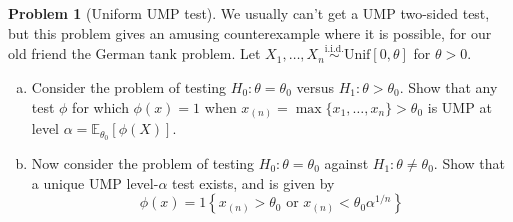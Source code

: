 \documentclass{article}
\newcommand{\EE}{\mathbb{E}}
\newcommand{\simiid}{\overset{\text{i.i.d.}}{\sim}}
\theoremstyle{definition}
\newtheorem{problem}{Problem}
\begin{document}
\begin{problem}[Uniform UMP test]
We usually can't get a UMP two-sided test, but this problem gives an amusing counterexample where it is possible, for our old friend the German tank problem. Let $X_1, \ldots, X_n \simiid \text{Unif}[0,\theta]$ for $\theta > 0$.
\begin{enumerate}[(a)]
\item Consider the problem of testing $H_0: \theta = \theta_0$
  versus $H_1: \theta > \theta_0$.  Show that any test $\phi$ for which $\phi(x) = 1$ when $x_{(n)} = \max\{x_1, \ldots, x_n\} > \theta_0$ is UMP at level $\alpha = \EE_{\theta_0}[\phi(X)]$.

  


\item  Now consider the problem of testing $H_0: \theta = \theta_0$
against $H_1: \theta \neq \theta_0$.  Show that a unique UMP level-$\alpha$ test exists,
and is given by
\[
\phi(x) = 1\left\{x_{(n)} > \theta_0 \text{ or } x_{(n)} < \theta_0 \alpha^{1/n}\right\}
\]



\end{enumerate}

\end{problem}
\end{document}
